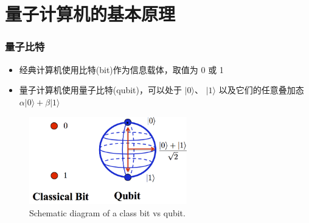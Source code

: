 \section{量子计算机的基本原理}
\begin{frame}
    \frametitle{量子比特}
    \begin{itemize}
	    \item 经典计算机使用比特\textrm{(bit)}作为信息载体，取值为 0 或 1
	    \item 量子计算机使用量子比特\textrm{(qubit)}，可以处于 \( |0\rangle \)、 \( |1\rangle \) 以及它们的任意叠加态 \( \alpha|0\rangle+\beta|1\rangle \)\\
		    {\fontsize{7.5pt}{5.2pt}\selectfont{其中 \( \alpha \) 和 \( \beta \) 是复数，且 \( |\alpha|^2 + |\beta|^2 = 1 \)}}
    \end{itemize}
            \begin{figure}
        \centering
                \includegraphics[height=1.5in, width=2.7in, viewport=0 0 360 195,clip]{Figures/Quantum-Bit.png}
		\caption{\tiny{\textrm{Schematic diagram of a class bit vs qubit.}}}
		\label{Fig:Quantum-Bit}
            \end{figure}
\end{frame}

